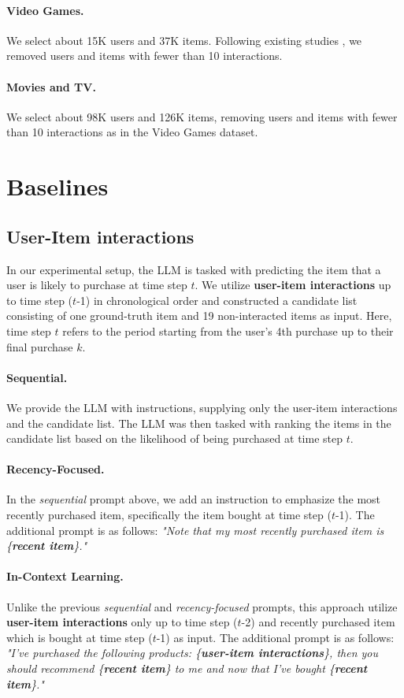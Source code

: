 \paragraph{Video Games.} We select about 15K users and 37K items. Following existing studies \cite{kang2018self}, we removed users and items with fewer than 10 interactions.

\paragraph{Movies and TV.} We select about 98K users and 126K items, removing users and items with fewer than 10 interactions as in the Video Games dataset.

\section{Baselines}
\label{app:baseline}

\subsection{User-Item interactions}
\label{app:interaction}
In our experimental setup, the LLM is tasked with predicting the item that a user is likely to purchase at time step $t$. We utilize \textbf{user-item interactions} up to time step ($t$-1) in chronological order and constructed a candidate list consisting of one ground-truth item and 19 non-interacted items as input. Here, time step $t$ refers to the period starting from the user's 4th purchase up to their final purchase $k$.
\paragraph{Sequential.}
We provide the LLM with instructions, supplying only the user-item interactions and the candidate list. The LLM was then tasked with ranking the items in the candidate list based on the likelihood of being purchased at time step $t$.
\paragraph{Recency-Focused.}
In the \emph{sequential} prompt above, we add an instruction to emphasize the most recently purchased item, specifically the item bought at time step ($t$-1). The additional prompt is as follows: \emph{"Note that my most recently purchased item is \{\textbf{recent item}\}."}
\paragraph{In-Context Learning.}
Unlike the previous \emph{sequential} and \emph{recency-focused} prompts, this approach utilize \textbf{user-item interactions} only up to time step ($t$-2) and recently purchased item which is bought at time step ($t$-1) as input. The additional prompt is as follows: \emph{"I've purchased the following products: \{\textbf{user-item interactions}\}, then you should recommend \{\textbf{recent item}\} to me and now that I've bought \{\textbf{recent item}\}."}


